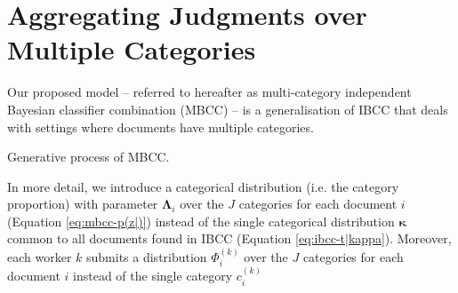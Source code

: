 \documentclass{article}
\begin{document}
\section{Aggregating Judgments over Multiple Categories}

\label{sec:2-Model-Description}

Our proposed model -- referred to hereafter as multi-category independent
Bayesian classifier combination (MBCC) -- is a generalisation of
IBCC that deals with settings where documents have multiple categories.
\begin{algorithm}[t]
\begin{algorithmic}[1]

\scriptsize


\State{}


\EndFor
\EndFor

\State{}


\EndFor
\EndFor

\EndFor

\State{}

\Return{$\boldsymbol{\Phi}$}
\end{algorithmic}

\protect\caption{\label{alg:MBCC-generative-process}Generative process of MBCC.}
\end{algorithm}
In more detail, we introduce a categorical distribution (i.e. the
category proportion) with parameter $\boldsymbol{\Lambda}_{i}$ over
the $J$ categories for each document $i$ (Equation \ref{eq:mbcc-p(z|)})
instead of the single categorical distribution $\boldsymbol{\kappa}$
common to all documents found in IBCC (Equation \ref{eq:ibcc-t|kappa}).
Moreover, each worker $k$
submits a distribution $\Phi_{i}^{(k)}$ over the $J$ categories
for each document $i$ instead of the single category $c_{i}^{(k)}$
\end{document}
